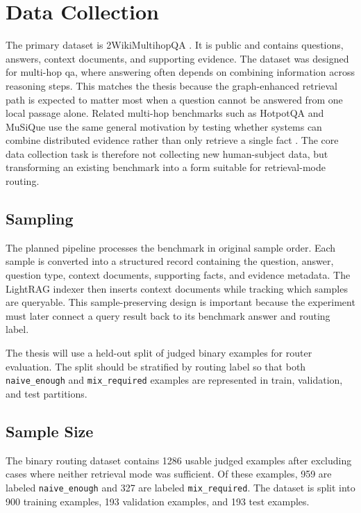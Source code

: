 \documentclass[english, bibtex]{kththesis}               %
\numberwithin{listing}{chapter}
\begin{document}
\section{Data Collection}
\label{sec:dataCollection}

The primary dataset is 2WikiMultihopQA \cite{ho2020twowiki}. It is public and contains questions, answers, context documents, and supporting evidence. The dataset was designed for multi-hop \gls{qa}, where answering often depends on combining information across reasoning steps. This matches the thesis because the graph-enhanced retrieval path is expected to matter most when a question cannot be answered from one local passage alone. Related multi-hop benchmarks such as HotpotQA and MuSiQue use the same general motivation by testing whether systems can combine distributed evidence rather than only retrieve a single fact \cite{yang2018hotpotqa,trivedi2022musique}. The core data collection task is therefore not collecting new human-subject data, but transforming an existing benchmark into a form suitable for retrieval-mode routing.

\subsection{Sampling}

The planned pipeline processes the benchmark in original sample order. Each sample is converted into a structured record containing the question, answer, question type, context documents, supporting facts, and evidence metadata. The LightRAG indexer then inserts context documents while tracking which samples are queryable. This sample-preserving design is important because the experiment must later connect a query result back to its benchmark answer and routing label.

The thesis will use a held-out split of judged binary examples for router evaluation. The split should be stratified by routing label so that both \texttt{naive\_enough} and \texttt{mix\_required} examples are represented in train, validation, and test partitions.

\subsection{Sample Size}

The binary routing dataset contains 1286 usable judged examples after excluding cases where neither retrieval mode was sufficient. Of these examples, 959 are labeled \texttt{naive\_enough} and 327 are labeled \texttt{mix\_required}. The dataset is split into 900 training examples, 193 validation examples, and 193 test examples.
\end{document}
